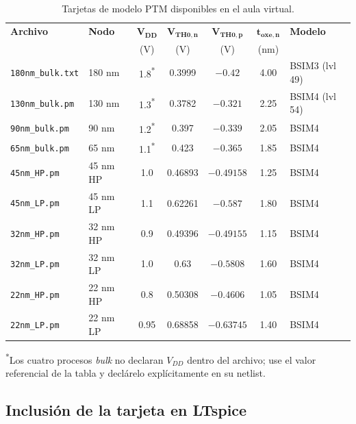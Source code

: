 \documentclass[11pt,a4paper]{article}
\begin{document}
\begin{table}[htbp]
\centering
\small
\caption{Tarjetas de modelo PTM disponibles en el aula virtual.}
\label{tab:ptm}
\begin{tabular}{@{}llccccl@{}}
\toprule
\textbf{Archivo} & \textbf{Nodo} & $\bm{V_{DD}}$ & $\bm{V_{TH0,n}}$ & $\bm{V_{TH0,p}}$ & $\bm{t_{oxe,n}}$ & \textbf{Modelo} \\
 & & (V) & (V) & (V) & (nm) & \\
\midrule
\texttt{180nm\_bulk.txt} & 180 nm    & 1.8\textsuperscript{*} & 0.3999  & $-0.42$    & 4.00 & BSIM3 (lvl 49) \\
\texttt{130nm\_bulk.pm}  & 130 nm    & 1.3\textsuperscript{*} & 0.3782  & $-0.321$   & 2.25 & BSIM4 (lvl 54) \\
\texttt{90nm\_bulk.pm}   & 90 nm     & 1.2\textsuperscript{*} & 0.397   & $-0.339$   & 2.05 & BSIM4 \\
\texttt{65nm\_bulk.pm}   & 65 nm     & 1.1\textsuperscript{*} & 0.423   & $-0.365$   & 1.85 & BSIM4 \\
\texttt{45nm\_HP.pm}     & 45 nm HP  & 1.0 & 0.46893 & $-0.49158$ & 1.25 & BSIM4 \\
\texttt{45nm\_LP.pm}     & 45 nm LP  & 1.1 & 0.62261 & $-0.587$   & 1.80 & BSIM4 \\
\texttt{32nm\_HP.pm}     & 32 nm HP  & 0.9 & 0.49396 & $-0.49155$ & 1.15 & BSIM4 \\
\texttt{32nm\_LP.pm}     & 32 nm LP  & 1.0 & 0.63    & $-0.5808$  & 1.60 & BSIM4 \\
\texttt{22nm\_HP.pm}     & 22 nm HP  & 0.8 & 0.50308 & $-0.4606$  & 1.05 & BSIM4 \\
\texttt{22nm\_LP.pm}     & 22 nm LP  & 0.95& 0.68858 & $-0.63745$ & 1.40 & BSIM4 \\
\bottomrule
\end{tabular}

\vspace{0.4em}
\parbox{0.92\textwidth}{\footnotesize \textsuperscript{*}Los cuatro procesos \emph{bulk} no declaran $V_{DD}$ dentro del archivo; use el valor referencial de la tabla y declárelo explícitamente en su netlist.}
\end{table}



\subsection{Inclusión de la tarjeta en LTspice}
\end{document}
